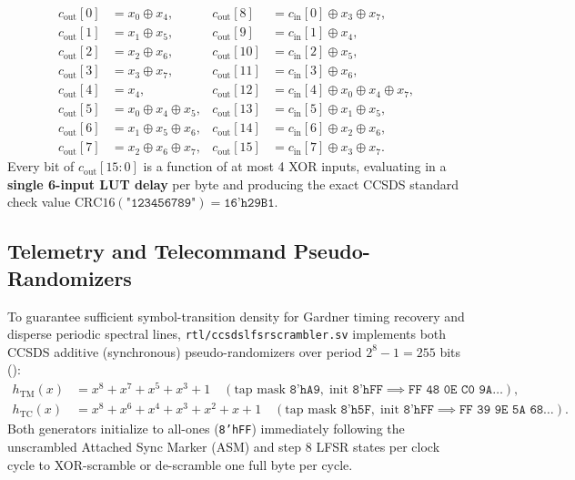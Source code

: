 \documentclass[10pt,a4paper]{article}
\renewcommand{\_}{\origunderscore\penalty0\hskip0pt\relax}
\numberwithin{equation}{section}
\numberwithin{table}{section}
\numberwithin{figure}{section}
\begin{document}
\begin{equation}
\begin{aligned}
  c_{\text{out}}[0]  &= x_0 \oplus x_4,                  & c_{\text{out}}[8]  &= c_{\text{in}}[0] \oplus x_3 \oplus x_7, \\
  c_{\text{out}}[1]  &= x_1 \oplus x_5,                  & c_{\text{out}}[9]  &= c_{\text{in}}[1] \oplus x_4, \\
  c_{\text{out}}[2]  &= x_2 \oplus x_6,                  & c_{\text{out}}[10] &= c_{\text{in}}[2] \oplus x_5, \\
  c_{\text{out}}[3]  &= x_3 \oplus x_7,                  & c_{\text{out}}[11] &= c_{\text{in}}[3] \oplus x_6, \\
  c_{\text{out}}[4]  &= x_4,                             & c_{\text{out}}[12] &= c_{\text{in}}[4] \oplus x_0 \oplus x_4 \oplus x_7, \\
  c_{\text{out}}[5]  &= x_0 \oplus x_4 \oplus x_5,       & c_{\text{out}}[13] &= c_{\text{in}}[5] \oplus x_1 \oplus x_5, \\
  c_{\text{out}}[6]  &= x_1 \oplus x_5 \oplus x_6,       & c_{\text{out}}[14] &= c_{\text{in}}[6] \oplus x_2 \oplus x_6, \\
  c_{\text{out}}[7]  &= x_2 \oplus x_6 \oplus x_7,       & c_{\text{out}}[15] &= c_{\text{in}}[7] \oplus x_3 \oplus x_7.
\end{aligned}
\end{equation}
Every bit of $c_{\text{out}}[15:0]$ is a function of at most 4 XOR inputs, evaluating in a \textbf{single 6-input LUT delay} per byte and producing the exact CCSDS standard check value $\text{CRC16}(\texttt{"123456789"}) = \texttt{16'h29B1}$.

\subsection{Telemetry and Telecommand Pseudo-Randomizers}
To guarantee sufficient symbol-transition density for Gardner timing recovery and disperse periodic spectral lines, \texttt{rtl/ccsds\_lfsr\_scrambler.sv} implements both CCSDS additive (synchronous) pseudo-randomizers over period $2^8 - 1 = 255$ bits (\cite{ccsds131,ccsds231}):
\begin{align}
  h_{\text{TM}}(x) &= x^8 + x^7 + x^5 + x^3 + 1 \quad (\text{tap mask } \texttt{8'hA9},\; \text{init } \texttt{8'hFF} \implies \texttt{FF 48 0E C0 9A}\dots), \\
  h_{\text{TC}}(x) &= x^8 + x^6 + x^4 + x^3 + x^2 + x + 1 \quad (\text{tap mask } \texttt{8'h5F},\; \text{init } \texttt{8'hFF} \implies \texttt{FF 39 9E 5A 68}\dots).
\end{align}
Both generators initialize to all-ones (\texttt{8'hFF}) immediately following the unscrambled Attached Sync Marker (ASM) and step 8 LFSR states per clock cycle to XOR-scramble or de-scramble one full byte per cycle.
\end{document}
